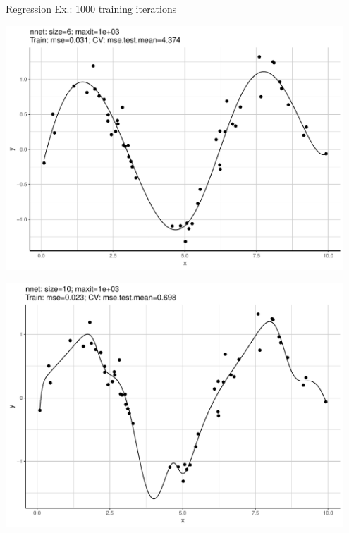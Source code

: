 \begin{vbframe}{Regression Ex.: 1000 training iterations}
\begin{knitrout}
{}




{\centering \includegraphics[width=0.95\textwidth]{figure/unnamed-chunk-5-6} 

}




{\centering \includegraphics[width=0.95\textwidth]{figure/unnamed-chunk-5-7} 

}



\end{knitrout}
\end{vbframe}
